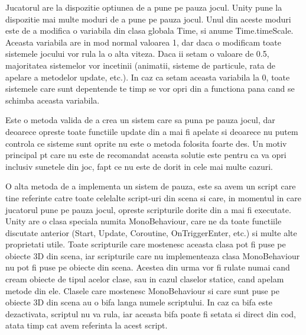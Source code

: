 \documentclass[12pt, a4paper]{article}
\begin{document}
	Jucatorul are la dispozitie optiunea de a pune pe pauza jocul. Unity pune la dispozitie mai multe moduri de a pune pe pauza jocul. Unul din aceste moduri este de a modifica o variabila din clasa globala Time, si anume Time.timeScale. Aceasta variabila are in mod normal valoarea 1, dar daca o modificam toate sistemele jocului vor rula la o alta viteza. Daca ii setam o valoare de 0.5, majoritatea sistemelor vor incetinii (animatii, sisteme de particule, rata de apelare a metodelor update, etc.). In caz ca setam aceasta variabila la 0, toate sistemele care sunt depentende te timp se vor opri din a functiona pana cand se schimba aceasta variabila. 
	\newline
	
	Este o metoda valida de a crea un sistem care sa puna pe pauza jocul, dar deoarece opreste toate functiile update din a mai fi apelate si deoarece nu putem controla ce sisteme sunt oprite nu este o metoda folosita foarte des. Un motiv principal pt care nu este de recomandat aceasta solutie este pentru ca va opri inclusiv sunetele din joc, fapt ce nu este de dorit in cele mai multe cazuri.
	\newline
	
	O alta metoda de a implementa un sistem de pauza, este sa avem un script care tine referinte catre toate celelalte script-uri din scena si care, in momentul in care jucatorul pune pe pauza jocul, opreste scripturile dorite din a mai fi executate. Unity are o clasa speciala numita MonoBehaviour, care ne da toate functiile discutate anterior (Start, Update, Coroutine, OnTriggerEnter, etc.) si multe alte proprietati utile. Toate scripturile care mostenesc aceasta clasa pot fi puse pe obiecte 3D din scena, iar scripturile care nu implementeaza clasa MonoBehaviour nu pot fi puse pe obiecte din scena. Acestea din urma vor fi rulate numai cand cream obiecte de tipul acelor clase, sau in cazul claselor statice, cand apelam metode din ele. Clasele care mostenesc MonoBehaviour si care sunt puse pe obiecte 3D din scena au o bifa langa numele scriptului. In caz ca bifa este dezactivata, scriptul nu va rula, iar aceasta bifa poate fi setata si direct din cod, atata timp cat avem referinta la acest script. 
	\newline
	
\end{document}
